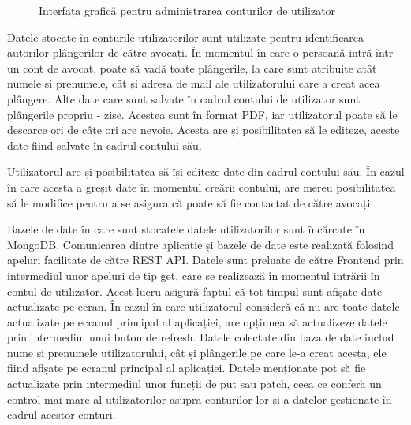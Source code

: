 \documentclass[12pt,a4paper]{report}
\theoremstyle{definition}
\theoremstyle{remark}
\begin{document}
\begin{figure}[H]
  \caption{Interfața grafică pentru administrarea conturilor de utilizator}
\end{figure}
Datele stocate în conturile utilizatorilor sunt utilizate pentru identificarea autorilor plângerilor de către avocați. În momentul în care o persoană intră într-un cont de avocat, poate să vadă toate plângerile, la care sunt atribuite atât numele și prenumele, cât și adresa de mail ale utilizatorului care a creat acea plângere. Alte date care sunt salvate în cadrul contului de utilizator sunt plângerile propriu - zise. Acestea sunt în format PDF, iar utilizatorul poate să le descarce ori de câte ori are nevoie. Acesta are și posibilitatea să le editeze, aceste date fiind salvate în cadrul contului său.

Utilizatorul are și posibilitatea să își editeze date din cadrul contului său. În cazul în care acesta a greșit date în momentul creării contului, are mereu posibilitatea să le modifice pentru a se asigura că poate să fie contactat de către avocați. 

Bazele de date în care sunt stocatele datele utilizatorilor sunt încărcate în MongoDB. Comunicarea dintre aplicație și bazele de date este realizată folosind apeluri facilitate de către REST API. Datele sunt preluate de către Frontend prin intermediul unor apeluri de tip get, care se realizează în momentul intrării în contul de utilizator. Acest lucru asigură faptul că tot timpul sunt afișate date actualizate pe ecran. În cazul în care utilizatorul consideră că nu are toate datele actualizate pe ecranul principal al aplicației, are opțiunea să actualizeze datele prin intermediul unui buton de refresh. Datele colectate din baza de date includ nume și prenumele utilizatorului, cât și plângerile pe care le-a creat acesta, ele fiind afișate pe ecranul principal al aplicației. Datele menționate pot să fie actualizate prin intermediul unor funcții de put sau patch, ceea ce conferă un control mai mare al utilizatorilor asupra conturilor lor și a datelor gestionate în cadrul acestor conturi.
\newpage
\end{document}
